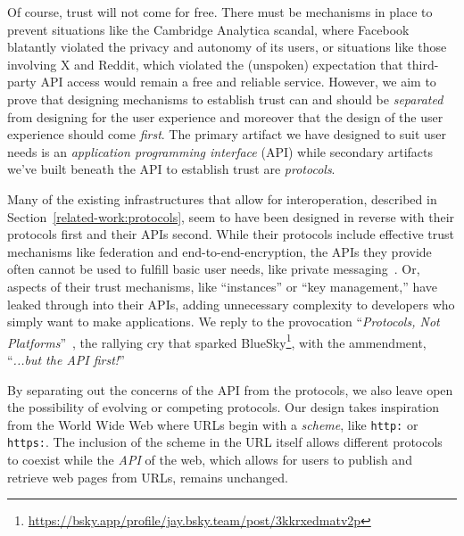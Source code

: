 Of course, trust will not come for free.
There must be mechanisms in place to prevent situations like
the Cambridge Analytica scandal, where Facebook blatantly violated the
privacy and autonomy of its users,
or situations like those involving X and Reddit, which violated
the (unspoken) expectation that third-party API access would
remain a free and reliable service.
However, we aim to prove that designing mechanisms to establish trust can and should be
\emph{separated} from designing for the user experience and moreover that
the design of the user experience should come \emph{first}.
The primary artifact we have designed to suit user needs is
an \emph{application programming interface} (API) while
secondary artifacts we've built beneath the API
to establish trust are \emph{protocols}.

Many of the existing infrastructures that allow for interoperation,
described in Section~\ref{related-work:protocols},
seem to have been designed in reverse with their protocols first and their APIs second.
While their protocols include effective trust mechanisms like federation and end-to-end-encryption,
the APIs they provide often cannot be used to fulfill basic user needs, like private messaging~\cite{bluesky}.
Or, aspects of their trust mechanisms,
like ``instances'' or ``key management,''
have leaked through into their APIs,
adding unnecessary complexity to developers
who simply want to make applications.
We reply to the provocation ``\emph{Protocols, Not Platforms}''~\cite{protocolsnotplatforms},
the rallying cry that sparked BlueSky\footnote{
\url{https://bsky.app/profile/jay.bsky.team/post/3kkrxedmatv2p}
},
with the ammendment, ``\emph{...but the API first!}''


By separating out the concerns of the API from the protocols,
we also leave open the possibility of evolving or competing protocols.
Our design takes inspiration from the World Wide Web
where URLs begin with a \emph{scheme}, like \texttt{http:} or \texttt{https:}. The inclusion of the scheme
in the URL itself allows different protocols to coexist
while the \emph{API} of the web, which allows for users to publish and retrieve
web pages from URLs, remains unchanged.

